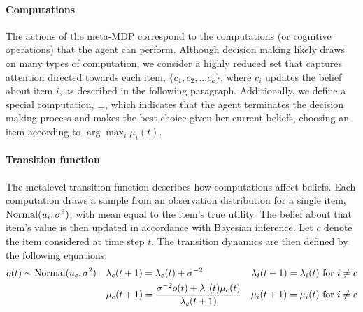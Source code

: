 \documentclass[11pt]{article} %
\begin{document}
\paragraph{Computations}
The actions of the meta-MDP correspond to the computations (or cognitive operations) that the agent can perform. Although decision making likely draws on many types of computation, we consider a highly reduced set that captures attention directed towards each item, $\{c_1, c_2, \dots c_k \}$, where $c_i$ updates the belief about item $i$, as described in the following paragraph.
Additionally, we define a special computation, $\bot$, which indicates that the agent terminates the decision making process and makes the best choice given her current beliefs, choosing an item according to $\arg\max_i \mu_i(t)$.

\paragraph{Transition function}
The metalevel transition function describes how computations affect beliefs. Each computation draws a sample from an observation distribution for a single item, $\mathrm{Normal}(u_i, \sigma^2)$, with mean equal to the item's true utility. The belief about that item's value is then updated in accordance with Bayesian inference. Let $c$ denote the item considered at time step $t$. The transition dynamics are then defined by the following equations:
\begin{equation}
\begin{aligned}
  o(t) \sim \mathrm{Normal}(u_{c}, \sigma^2)\quad
  & \lambda_c(t+1) = \lambda_c(t) + \sigma^{-2}  &
  \lambda_i(t+1) = \lambda_i(t) \text{ for } i \neq c  \\
  & \mu_{c}(t+1) = \frac{\sigma^{-2} o(t) + \lambda_{c}(t) \mu_{c}(t)}{\lambda_{c}(t+1)}  &
  \mu_i(t+1) = \mu_i(t) \text{ for } i \neq c  \\
\end{aligned}
\end{equation}
\end{document}
